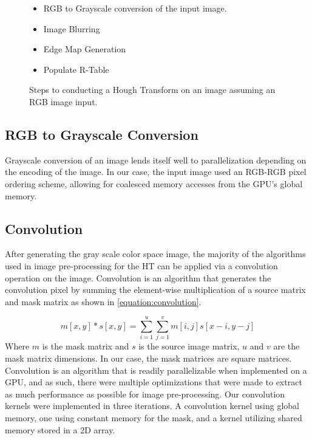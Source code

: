 \documentclass[12pt]{article}
\begin{document}
\begin{figure}
  \begin{itemize}
    \item RGB to Grayscale conversion of the input image.
    \item Image Blurring 
    \item Edge Map Generation
    \item Populate R-Table
  \end{itemize}\caption{Steps to conducting a Hough Transform on an image assuming an RGB image input.}\label{figure:hough-transform-steps}
\end{figure}

\subsection{RGB to Grayscale Conversion}
Grayscale conversion of an image lends itself well to parallelization depending on the encoding of the image.
In our case, the input image used an RGB-RGB pixel ordering scheme, allowing for coalesced memory accesses from the GPU's global memory.


\subsection{Convolution}
After generating the gray scale color space image, the majority of the algorithms used in image pre-processing for the HT can be applied via a convolution operation on the image.
Convolution is an algorithm that generates the convolution pixel by summing the element-wise multiplication of a source matrix and mask matrix as shown in \ref{equation:convolution}.

\begin{equation}
  m[x,y] * s[x,y] = \sum\limits_{i = 1}^{u} \sum\limits_{j = 1}^{v} m[i,j]s[x-i, y-j]
  \label{equation:convolution}
\end{equation}
Where $m$ is the mask matrix and $s$ is the source image matrix, $u$ and $v$ are the mask matrix dimensions. In our case, the mask matrices are square matrices.
Convolution is an algorithm that is readily parallelizable when implemented on a GPU, and as such, there were multiple optimizations that were made to extract as much performance as possible for image pre-processing.
Our convolution kernels were implemented in three iterations. 
A convolution kernel using global memory, one using constant memory for the mask, and a kernel utilizing shared memory stored in a 2D array.
\end{document}

